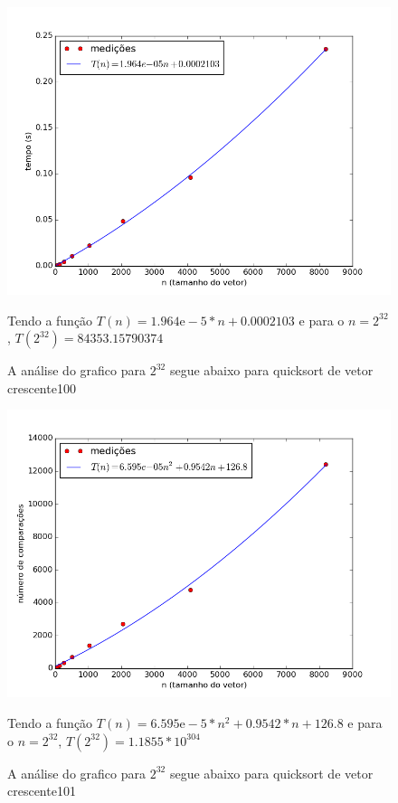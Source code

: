 \documentclass[12pt,a4paper,twoside]{report}
\begin{document}


\begin{figure}[ht]
\centering \includegraphics[scale=0.8]{../quicksort/imagens/quicksortQuaseCresc100.png}
\caption{A análise do grafico para $2^{32}$ segue abaixo para quicksort de vetor crescente100}
Tendo a função $T(n) = 1.964\mathrm{e}-5*n+0.0002103$ e para o $n =2^{32}$, $T(2^{32}) = 84353.15790374$ 
\label{fig:quicksortQuaseCresc100}
\end{figure}


\begin{figure}[ht]
\centering \includegraphics[scale=0.8]{../quicksort/imagens/quicksortQuaseCresc101.png}
\caption{A análise do grafico para $2^{32}$ segue abaixo para quicksort de vetor crescente101}

Tendo a função $T(n) = 6.595\mathrm{e}-5*n^2+0.9542*n+126.8$ e para o $n =2^{32}$, $T(2^{32}) = 1.1855*10^{304}$ 

\label{fig:quicksortQuaseCresc101}
\end{figure}
\end{document}
